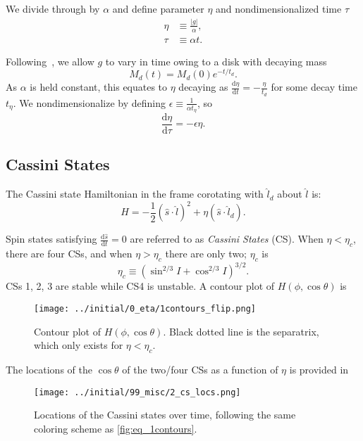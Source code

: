 \documentclass[
        fleqn,
        usenatbib,
    ]{mnras}
\newcommand*{\rd}[2]{\frac{\mathrm{d}#1}{\mathrm{d}#2}}
\newcommand*{\abs}[1]{\left|#1\right|}
\newcommand*{\p}[1]{\left(#1\right)}
\begin{document}
We divide through by $\alpha$ and define parameter $\eta$ and nondimensionalized
time $\tau$
\begin{align}
    \eta &\equiv \frac{\abs{g}}{\alpha}\label{eq:eta},\\
    \tau &\equiv \alpha t.
\end{align}

Following~\cite{millholland_disk}, we allow $g$ to vary in time owing to a
disk with decaying mass
\begin{equation}
    M_d(t) = M_d(0)e^{-t/t_d}.
\end{equation}
As $\alpha$ is held constant, this equates to $\eta$ decaying as $\rd{\eta}{t} =
-\frac{\eta}{t_d}$ for some decay time $t_\eta$. We nondimensionalize by
defining $\epsilon \equiv \frac{1}{\alpha t_\eta}$, so
\begin{equation}
    \rd{\eta}{\tau} = -\epsilon \eta.
\end{equation}

\subsection{Cassini States}\label{ss:cs}

The Cassini state Hamiltonian in the frame corotating with $\hat{l}_d$ about
$\hat{l}$ is:
\begin{equation}
    H = -\frac{1}{2}\p{\hat{s} \cdot \hat{l}}^2
        + \eta \p{\hat{s} \cdot \hat{l}_d}.
\end{equation}

Spin states satisfying $\rd{\hat{s}}{t} = 0$ are referred to as \emph{Cassini
States} (CS). When $\eta < \eta_c$, there are four CSs, and when $\eta > \eta_c$
there are only two; $\eta_c$ is \citep{henrard1987,ward2004I}
\begin{equation}
    \eta_c \equiv \p{\sin^{2/3}I + \cos^{2/3}I}^{3/2}.
\end{equation}
CSs 1, 2, 3 are stable while CS4 is unstable. A contour plot of $H\p{\phi, \cos
\theta}$ is
\begin{figure}
    \centering
    \texttt{[image: ../initial/0\_eta/1contours\_flip.png]}
    \caption{Contour plot of $H\p{\phi, \cos \theta}$. Black dotted line is the
    separatrix, which only exists for $\eta < \eta_c$.}\label{fig:eq_1contours}
\end{figure}

The locations of the $\cos\theta$ of the two/four CSs as a function of $\eta$ is
provided in
\begin{figure}[t]
    \centering
    \texttt{[image: ../initial/99\_misc/2\_cs\_locs.png]}
    \caption{Locations of the Cassini states over time, following the same
    coloring scheme as \autoref{fig:eq_1contours}.}\label{fig:cs_locs}
\end{figure}
\end{document}
